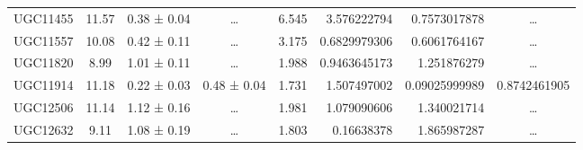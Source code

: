 \documentclass[reprint,%
 amsmath,amssymb,
 aps,
]{revtex4-1}
\begin{document}
\begin{table}[]
\begin{tabular}{cccccrrc}
\rowcolor[HTML]{F3F3F3} 
UGC11455             & 11.57                     & 0.38 ± 0.04           & …                      & 6.545                                                        & 3.576222794                                                           & 0.7573017878                                                          & …                                                             \\
\rowcolor[HTML]{F3F3F3} 
UGC11557             & 10.08                     & 0.42 ± 0.11           & …                      & 3.175                                                        & 0.6829979306                                                          & 0.6061764167                                                          & …                                                             \\
\rowcolor[HTML]{F3F3F3} 
UGC11820             & 8.99                      & 1.01 ± 0.11           & …                      & 1.988                                                        & 0.9463645173                                                          & 1.251876279                                                           & …                                                             \\
\rowcolor[HTML]{F3F3F3} 
UGC11914             & 11.18                     & 0.22 ± 0.03           & 0.48 ± 0.04            & 1.731                                                        & 1.507497002                                                           & 0.09025999989                                                         & \multicolumn{1}{r}{\cellcolor[HTML]{F3F3F3}0.8742461905}      \\
\rowcolor[HTML]{F3F3F3} 
UGC12506             & 11.14                     & 1.12 ± 0.16           & …                      & 1.981                                                        & 1.079090606                                                           & 1.340021714                                                           & …                                                             \\
\rowcolor[HTML]{F3F3F3} 
UGC12632             & 9.11                      & 1.08 ± 0.19           & …                      & 1.803                                                        & 0.16638378                                                            & 1.865987287                                                           & …                                                             \\

\end{tabular}
\end{table}
\end{document}
